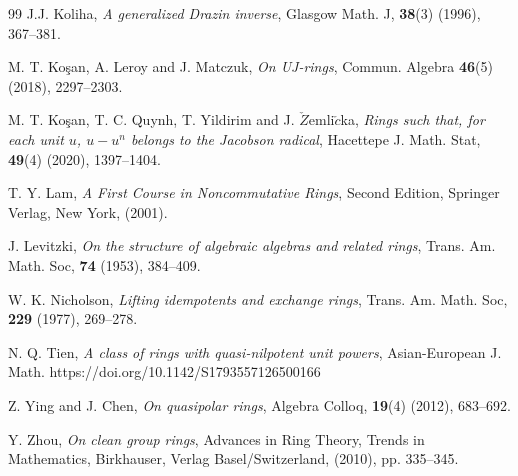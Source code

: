 \documentclass[12pt]{amsart}
\theoremstyle{definition}
\begin{document}
\begin{thebibliography}{99}
J.J. Koliha, {\it A generalized Drazin inverse}, Glasgow Math. J, {\bf 38}(3) (1996), 367--381.

M. T. Ko\c{s}an, A. Leroy and J. Matczuk, {\it On UJ-rings}, Commun. Algebra {\bf 46}(5) (2018), 2297--2303.

M. T. Ko\c{s}an, T. C. Quynh, T. Yildirim and J. $\check{Z}$emli$\check{c}$ka, {\it Rings such that, for each unit $u$, $u - u^n$ belongs to the Jacobson radical}, Hacettepe J. Math. Stat, {\bf 49}(4) (2020), 1397--1404.	

T. Y. Lam, {\it A First Course in Noncommutative Rings}, Second Edition, Springer Verlag, New York, (2001).

J. Levitzki, {\it On the structure of algebraic algebras and related rings}, Trans. Am. Math. Soc, {\bf 74} (1953), 384--409.

W. K. Nicholson, {\it Lifting idempotents and exchange rings}, Trans. Am. Math. Soc, {\bf 229} (1977), 269--278.	

N. Q. Tien, {\it A class of rings with quasi-nilpotent unit powers}, Asian-European J. Math. https://doi.org/10.1142/S1793557126500166
	
Z. Ying and J. Chen, {\it On quasipolar rings}, Algebra Colloq, {\bf 19}(4) (2012), 683--692.

Y. Zhou, {\it On clean group rings}, Advances in Ring Theory, Trends in Mathematics, Birkhauser, Verlag Basel/Switzerland, (2010), pp. 335--345.

\end{thebibliography}
\end{document}
